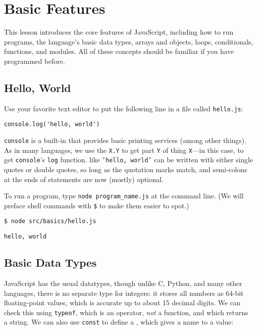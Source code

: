 \chapter{Basic Features}\label{s:basics}

This lesson introduces the core features of JavaScript,
including how to run programs,
the language's basic data types,
arrays and objects,
loops,
conditionals,
functions,
and modules.
All of these concepts should be familiar if you have programmed before.

\section{Hello, World}\label{s:basics-hello-world}

Use your favorite text editor to put the following line in a file called \texttt{hello.js}:

\begin{verbatim}
console.log('hello, world')
\end{verbatim}

\texttt{console} is a built-in  that provides basic printing services
(among other things).
As in many languages,
we use the  \texttt{X.Y} to get part \texttt{Y} of thing \texttt{X}---in this case,
to get \texttt{console}'s \texttt{log} function.
 like \texttt{'hello,\ world'} can be written with either single quotes or double quotes,
so long as the quotation marks match,
and semi-colons at the ends of statements are now (mostly) optional.

To run a program,
type \texttt{node\ program\_name.js} at the command line.
(We will preface shell commands with \texttt{\$} to make them easier to spot.)

\begin{verbatim}
$ node src/basics/hello.js
\end{verbatim}

\begin{verbatim}
hello, world
\end{verbatim}

\section{Basic Data Types}\label{s:basics-data-types}

JavaScript has the usual datatypes,
though unlike C, Python, and many other languages,
there is no separate type for integers:
it stores all numbers as 64-bit floating-point values,
which is accurate up to about 15 decimal digits.
We can check this using \texttt{typeof},
which is an operator, \emph{not} a function,
and which returns a string.
We can also use \texttt{const} to define a ,
which gives a name to a value:

